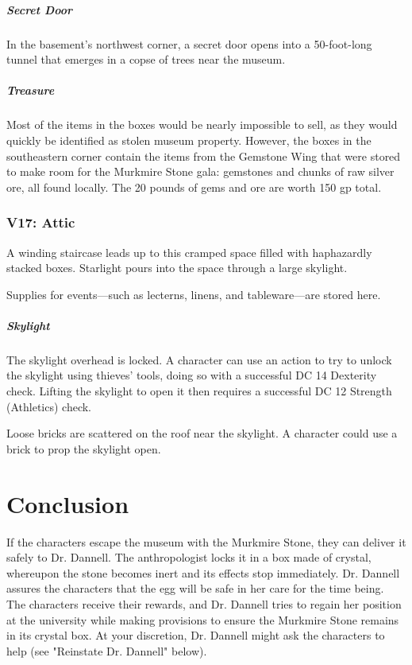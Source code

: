 \documentclass[10pt,a4paper,twoside,bg=print,twocolumn,openany,nodeprecatedcode]{dndbook}
\begin{document}
\subparagraph{Secret Door}
In the basement's northwest corner, a secret door opens into a 50-foot-long tunnel that emerges in a copse of trees near the museum.

\subparagraph{Treasure}
Most of the items in the boxes would be nearly impossible to sell, as they would quickly be identified as stolen museum property. However, the boxes in the southeastern corner contain the items from the Gemstone Wing that were stored to make room for the Murkmire Stone gala: gemstones and chunks of raw silver ore, all found locally. The 20 pounds of gems and ore are worth 150 gp total.

\subsubsection{V17: Attic}
\begin{DndReadAloud}{}
A winding staircase leads up to this cramped space filled with haphazardly stacked boxes. Starlight pours into the space through a large skylight.

\end{DndReadAloud}

Supplies for events—such as lecterns, linens, and tableware—are stored here.

\subparagraph{Skylight}
The skylight overhead is locked. A character can use an action to try to unlock the skylight using thieves' tools, doing so with a successful DC 14 Dexterity check. Lifting the skylight to open it then requires a successful DC 12 Strength (Athletics) check.

Loose bricks are scattered on the roof near the skylight. A character could use a brick to prop the skylight open.

\section{Conclusion}
If the characters escape the museum with the Murkmire Stone, they can deliver it safely to Dr. Dannell. The anthropologist locks it in a box made of crystal, whereupon the stone becomes inert and its effects stop immediately. Dr. Dannell assures the characters that the egg will be safe in her care for the time being. The characters receive their rewards, and Dr. Dannell tries to regain her position at the university while making provisions to ensure the Murkmire Stone remains in its crystal box. At your discretion, Dr. Dannell might ask the characters to help (see "Reinstate Dr. Dannell" below).
\end{document}
